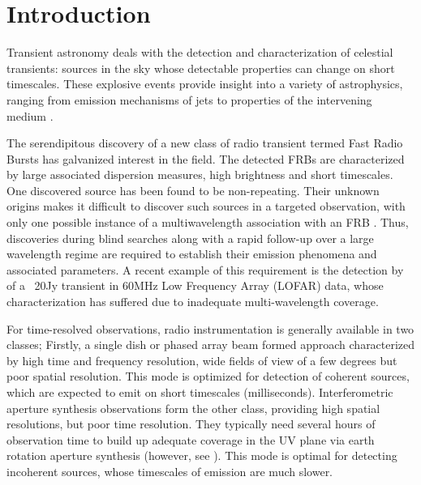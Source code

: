 \documentclass{ws-jai}
\begin{document}

\section{\label{sec:Introduction}Introduction}

\noindent Transient astronomy  deals with the detection  and characterization of
celestial transients: sources in the  sky whose detectable properties can change
on short timescales.   These explosive events provide insight into  a variety of
astrophysics,  ranging from  emission mechanisms  of jets  to properties  of the
intervening  medium \citep{fender2006lofar,lazio2009dynamic,cordes2004dynamic}.  


The serendipitous discovery of a new  class of radio transient termed Fast Radio
Bursts  \citep[FRBs;][]{spitler2015fast, thornton2013population}  has galvanized
interest in the field.  The detected  FRBs are characterized by large associated
dispersion  measures,   high  brightness   and  short  timescales.    One  \cite
{spitler2016repeating}  discovered source  has been  found to  be non-repeating.
Their unknown origins makes it difficult  to discover such sources in a targeted
observation, with  only one possible  instance of a  multiwavelength association
with an FRB \cite {keane2016host}. Thus, discoveries during blind searches along
with a rapid follow-up over a  large wavelength regime are required to establish
their emission  phenomena and associated  parameters.  A recent example  of this
requirement is the detection by \citet{stewart2016lofar} of a ~20Jy transient in
60MHz Low Frequency Array (LOFAR)  data, whose characterization has suffered due
to inadequate multi-wavelength coverage.

For time-resolved observations, radio  instrumentation is generally available in
two  classes; Firstly,  a  single  dish or  phased  array  beam formed  approach
characterized by  high time and frequency  resolution, wide fields of  view of a
few degrees but poor spatial resolution. This mode is optimized for detection of
coherent   sources,   which  are   expected   to   emit  on   short   timescales
(milliseconds). Interferometric  aperture synthesis observations form  the other
class,  providing  high spatial  resolutions,  but  poor time  resolution.  They
typically need several  hours of observation time to build  up adequate coverage
in  the UV  plane  via earth  rotation aperture  synthesis  (however, see  \cite
{law2012rrat,  law2012all}).   This mode  is  optimal  for detecting  incoherent
sources, whose timescales of emission are much slower.
\end{document}

